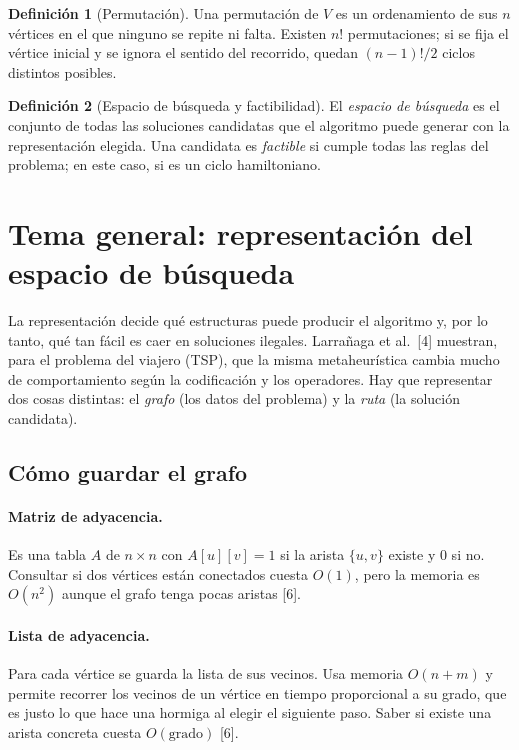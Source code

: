 \documentclass[11pt,letterpaper]{article}
\theoremstyle{definition}
\newtheorem{definicion}{Definición}
\begin{document}
\begin{definicion}[Permutación]
Una permutación de $V$ es un ordenamiento de sus $n$ vértices en el que ninguno se repite
ni falta. Existen $n!$ permutaciones; si se fija el vértice inicial y se ignora el sentido
del recorrido, quedan $(n-1)!/2$ ciclos distintos posibles.
\end{definicion}

\begin{definicion}[Espacio de búsqueda y factibilidad]
El \emph{espacio de búsqueda} es el conjunto de todas las soluciones candidatas que el
algoritmo puede generar con la representación elegida. Una candidata es \emph{factible}
si cumple todas las reglas del problema; en este caso, si es un ciclo hamiltoniano.
\end{definicion}

\section{Tema general: representación del espacio de búsqueda}

La representación decide qué estructuras puede producir el algoritmo y, por lo tanto, qué
tan fácil es caer en soluciones ilegales. Larrañaga et al.~[4] muestran, para el problema
del viajero (TSP), que la misma metaheurística cambia mucho de comportamiento según la
codificación y los operadores. Hay que representar dos cosas distintas: el \emph{grafo}
(los datos del problema) y la \emph{ruta} (la solución candidata).

\subsection{Cómo guardar el grafo}

\paragraph{Matriz de adyacencia.} Es una tabla $A$ de $n\times n$ con $A[u][v]=1$ si la
arista $\{u,v\}$ existe y $0$ si no. Consultar si dos vértices están conectados cuesta
$O(1)$, pero la memoria es $O(n^2)$ aunque el grafo tenga pocas aristas [6].

\paragraph{Lista de adyacencia.} Para cada vértice se guarda la lista de sus vecinos.
Usa memoria $O(n+m)$ y permite recorrer los vecinos de un vértice en tiempo proporcional a
su grado, que es justo lo que hace una hormiga al elegir el siguiente paso. Saber si existe
una arista concreta cuesta $O(\text{grado})$ [6].
\end{document}
